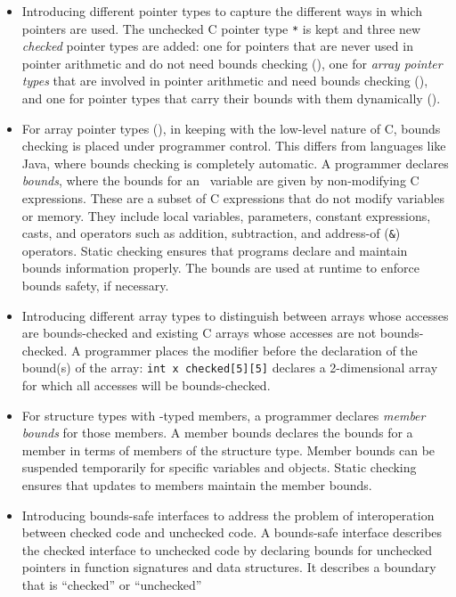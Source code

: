 \begin{itemize}
\item
  Introducing different pointer types to capture the different ways in
  which pointers are used. The unchecked C pointer type \texttt{*} is kept
  and three new {\it checked} pointer types are added: one for pointers that
  are never used in pointer arithmetic and do not need bounds checking (\ptr),
  one for \emph{array pointer types} that are involved in pointer
  arithmetic and need bounds checking (\arrayptr), and one for pointer types
  that carry their bounds with them dynamically (\spanptr).
\item
  For array pointer types (\arrayptr), in keeping with the low-level
  nature of C,  bounds checking is placed under programmer control. 
  This differs from languages like
  Java, where bounds checking is completely automatic. A programmer
  declares \emph{bounds}, where the bounds for an \arrayptr\
  variable are given by non-modifying C expressions. These are a subset
  of C expressions that do not modify variables or memory. They include
  local variables, parameters, constant expressions, casts, and
  operators such as addition, subtraction, and address-of (\texttt{\&})
  operators. Static checking ensures that programs declare and maintain
  bounds information properly. The bounds are used at runtime to enforce
  bounds safety, if necessary.
\item
  Introducing different array types to distinguish between arrays whose
  accesses are bounds-checked and existing C arrays whose accesses are
  not bounds-checked. A programmer places the modifier 
  before the declaration of the bound(s) of the array: \texttt{int x
  checked[5][5]} declares a 2-dimensional array for which all
  accesses will be bounds-checked.
\item
  For structure types with \arrayptr -typed members, a
  programmer declares \emph{member bounds} for those members. A member
  bounds declares the bounds for a member in terms of members of the
  structure type. Member bounds can be suspended temporarily for
  specific variables and objects. Static checking ensures that updates
  to members maintain the member bounds.
\item
  Introducing bounds-safe interfaces to address the problem of
  interoperation between checked code and unchecked code. A bounds-safe
  interface describes the checked interface to unchecked code by declaring
  bounds for unchecked pointers in function signatures and data structures.
  It describes a boundary that is ``checked'' or ``unchecked''

\end{itemize}
